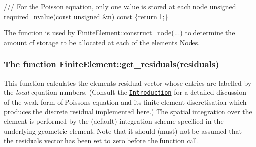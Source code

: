  
\begin{DoxyCodeInclude}
\textcolor{comment}{  /// For the Poisson equation, only one value is stored at each node}
\textcolor{comment}{}  \textcolor{keywordtype}{unsigned} required\_nvalue(\textcolor{keyword}{const} \textcolor{keywordtype}{unsigned} &n)\textcolor{keyword}{ const }\{\textcolor{keywordflow}{return} 1;\}

\end{DoxyCodeInclude}


The function is used by {\ttfamily Finite\+Element\+::construct\+\_\+node}(...) to determine the amount of storage to be allocated at each of the element\textquotesingle{}s {\ttfamily Nodes}.\hypertarget{index_residuals}{}\subsubsection{The function Finite\+Element\+::get\+\_\+residuals(residuals)}\label{index_residuals}
This function calculates the element\textquotesingle{}s residual vector whose entries are labelled by the {\itshape local} equation numbers. (Consult the \href{../../intro/html/index.html}{\tt Introduction} for a detailed discussion of the weak form of Poisson\textquotesingle{}s equation and its finite element discretisation which produces the discrete residual implemented here.) The spatial integration over the element is performed by the (default) integration scheme specified in the underlying geometric element. Note that it should (must) not be assumed that the residuals vector has been set to zero before the function call. 
